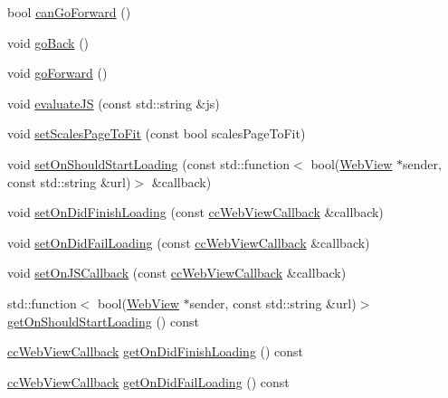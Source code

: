 \begin{DoxyCompactItemize}
bool \hyperlink{classexperimental_1_1ui_1_1WebView_a14f0dfa319d36a74db5afddf1a998b7d}{can\+Go\+Forward} ()
\item 
void \hyperlink{classexperimental_1_1ui_1_1WebView_a484fcf452270e21c41f192c41881c61f}{go\+Back} ()
\item 
void \hyperlink{classexperimental_1_1ui_1_1WebView_a7be24e3439501117335fb0063a1f4ea9}{go\+Forward} ()
\item 
void \hyperlink{classexperimental_1_1ui_1_1WebView_a5466fbae9364856565b8f4a6efa68ceb}{evaluate\+JS} (const std\+::string \&js)
\item 
void \hyperlink{classexperimental_1_1ui_1_1WebView_ab55307e1ac4bca0f38df14589a3c0924}{set\+Scales\+Page\+To\+Fit} (const bool scales\+Page\+To\+Fit)
\item 
void \hyperlink{classexperimental_1_1ui_1_1WebView_a212732b5b2ec9bd73084c57a140b5dd8}{set\+On\+Should\+Start\+Loading} (const std\+::function$<$ bool(\hyperlink{classexperimental_1_1ui_1_1WebView}{Web\+View} $\ast$sender, const std\+::string \&url)$>$ \&callback)
\item 
void \hyperlink{classexperimental_1_1ui_1_1WebView_a6fb8d736506be3151a8a5e3f08d6b7ea}{set\+On\+Did\+Finish\+Loading} (const \hyperlink{classexperimental_1_1ui_1_1WebView_a11ddd376a5996eff614857f236b2b69d}{cc\+Web\+View\+Callback} \&callback)
\item 
void \hyperlink{classexperimental_1_1ui_1_1WebView_aae599457e3ff606b3b3751bcebe1df29}{set\+On\+Did\+Fail\+Loading} (const \hyperlink{classexperimental_1_1ui_1_1WebView_a11ddd376a5996eff614857f236b2b69d}{cc\+Web\+View\+Callback} \&callback)
\item 
void \hyperlink{classexperimental_1_1ui_1_1WebView_a434bac1a0a15294300ada912b85c35f4}{set\+On\+J\+S\+Callback} (const \hyperlink{classexperimental_1_1ui_1_1WebView_a11ddd376a5996eff614857f236b2b69d}{cc\+Web\+View\+Callback} \&callback)
\item 
std\+::function$<$ bool(\hyperlink{classexperimental_1_1ui_1_1WebView}{Web\+View} $\ast$sender, const std\+::string \&url)$>$ \hyperlink{classexperimental_1_1ui_1_1WebView_ad8bf0cc832c0d88fcb1317563c14242f}{get\+On\+Should\+Start\+Loading} () const
\item 
\hyperlink{classexperimental_1_1ui_1_1WebView_a11ddd376a5996eff614857f236b2b69d}{cc\+Web\+View\+Callback} \hyperlink{classexperimental_1_1ui_1_1WebView_a2bebc9f5a5744de9e6e9a80d57bc6fde}{get\+On\+Did\+Finish\+Loading} () const
\item 
\hyperlink{classexperimental_1_1ui_1_1WebView_a11ddd376a5996eff614857f236b2b69d}{cc\+Web\+View\+Callback} \hyperlink{classexperimental_1_1ui_1_1WebView_a43b0257e48e199521030bb6a35578549}{get\+On\+Did\+Fail\+Loading} () const

\end{DoxyCompactItemize}
